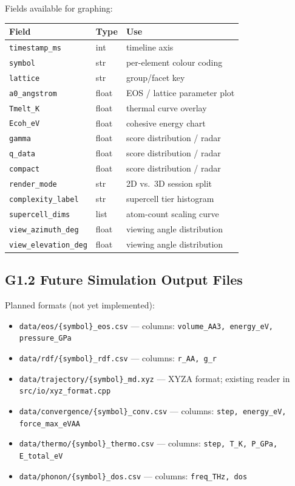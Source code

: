\documentclass[11pt,a4paper]{article}
\begin{document}
Fields available for graphing:

\begin{center}
\begin{tabular}{lll}
\toprule
Field & Type & Use \\
\midrule
\texttt{timestamp\_ms}       & int   & timeline axis \\
\texttt{symbol}              & str   & per-element colour coding \\
\texttt{lattice}             & str   & group/facet key \\
\texttt{a0\_angstrom}        & float & EOS / lattice parameter plot \\
\texttt{Tmelt\_K}            & float & thermal curve overlay \\
\texttt{Ecoh\_eV}            & float & cohesive energy chart \\
\texttt{gamma}               & float & score distribution / radar \\
\texttt{q\_data}             & float & score distribution / radar \\
\texttt{compact}             & float & score distribution / radar \\
\texttt{render\_mode}        & str   & 2D vs.\ 3D session split \\
\texttt{complexity\_label}   & str   & supercell tier histogram \\
\texttt{supercell\_dims}     & list  & atom-count scaling curve \\
\texttt{view\_azimuth\_deg}  & float & viewing angle distribution \\
\texttt{view\_elevation\_deg}& float & viewing angle distribution \\
\bottomrule
\end{tabular}
\end{center}

\subsection{G1.2 Future Simulation Output Files}
Planned formats (not yet implemented):

\begin{itemize}[leftmargin=2em]
  \item \texttt{data/eos/\{symbol\}\_eos.csv} ---
        columns: \texttt{volume\_AA3, energy\_eV, pressure\_GPa}
  \item \texttt{data/rdf/\{symbol\}\_rdf.csv} ---
        columns: \texttt{r\_AA, g\_r}
  \item \texttt{data/trajectory/\{symbol\}\_md.xyz} ---
        XYZA format; existing reader in \texttt{src/io/xyz\_format.cpp}
  \item \texttt{data/convergence/\{symbol\}\_conv.csv} ---
        columns: \texttt{step, energy\_eV, force\_max\_eVAA}
  \item \texttt{data/thermo/\{symbol\}\_thermo.csv} ---
        columns: \texttt{step, T\_K, P\_GPa, E\_total\_eV}
  \item \texttt{data/phonon/\{symbol\}\_dos.csv} ---
        columns: \texttt{freq\_THz, dos}
\end{itemize}
\end{document}

